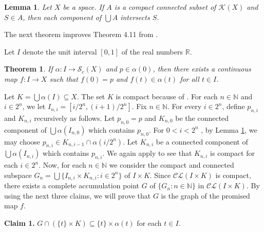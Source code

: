 \documentclass[11pt]{amsart}
\numberwithin{equation}{section}
\theoremstyle{plain}
\newtheorem{theorem}[equation]{Theorem}
\newtheorem{lemma}[equation]{Lemma}
\theoremstyle{definition}
\theoremstyle{definition}
\theoremstyle{definition}
\theoremstyle{definition}
\theoremstyle{definition}
\begin{document}
\begin{lemma}\label{LMPR}
Let $X$ be a space. If $A$ is a compact connected subset of $\mathcal{K}(X)$ and $S \in A$, then each component of $\bigcup A$ intersects $S$.
\end{lemma}

The next theorem improves Theorem 4.11 from \cite{may-pat-rob}.

\medskip

Let $I$ denote the unit interval  $[0,1]$ of the real numbers ${\mathbb R}$.

\begin{theorem}\label{SCCT}
 If $\alpha : I \to \mathcal{S}_c(X)$ and $p \in \alpha(0)$, then there exists a continuous map $f : I \to X$ such that $f(0) = p$ and $f(t) \in \alpha(t)$ for all $t \in I$.
\end{theorem}

\proof
Let $K = \bigcup \alpha(I) \subseteq X$. The set $K$ is compact because of \cite[Theorem 2.5]{emi}. For each $n \in {\mathbb N}$ and  $i \in 2^n$, we  let $I_{n,i} = [i/2^n,(i+1)/2^n]$. Fix $n \in {\mathbb N}$.  For every $i \in 2^n$, define $p_{n,i}$ and $K_{n,i}$ recursively as follows. Let $p_{n,0} = p$ and $K_{n,0}$ be the connected component of $\bigcup\alpha(I_{n,0})$ which contains $p_{n,0}$. For $0 < i < 2^n$ , by Lemma \ref{LMPR}, we may choose $p_{n,i} \in K_{n,i-1} \cap \alpha(i/2^n)$. Let $K_{n,i}$ be a connected component of $\bigcup\alpha(I_{n,i})$ which contains $p_{n,i}$. We again apply  \cite[Theorem 2.5]{emi} to see that $K_{n,i}$ is compact for each $i \in 2^n$. Now, for each $n \in {\mathbb N}$ we consider the  compact and connected subspace $G_n = \bigcup\{I_{n,i} \times K_{n,i} : i \in 2^n\}$ of $I \times K$. Since  $\mathcal{CL}(I \times K)$ is compact, there exists a complete accumulation point $G$ of $\{G_n : n \in {\mathbb N}\}$ in $\mathcal{CL}(I \times K)$. By using the next three claims,  we will prove that $G$ is the graph of the promised map $f$.\medskip

\textbf{Claim 1.} $G \cap (\{t\} \times K) \subseteq \{t\} \times \alpha(t)$ for each $t \in I$.\medskip
\end{document}
